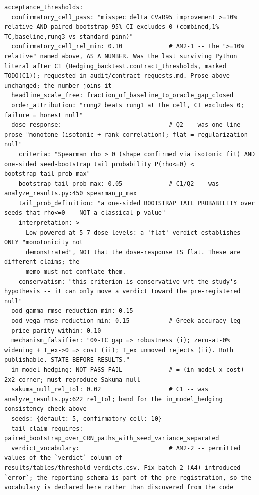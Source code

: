 \documentclass{article}
\begin{document}
\begin{lstlisting}[basicstyle=\ttfamily\tiny,breaklines=true,breakatwhitespace=true,keepspaces=true,columns=fullflexible,postbreak=\mbox{$\hookrightarrow$\space},breakindent=1.5em]
acceptance_thresholds:
  confirmatory_cell_pass: "misspec delta CVaR95 improvement >=10% relative AND paired-bootstrap 95% CI excludes 0 (combined,1% TC,baseline,rung3 vs standard_pinn)"
  confirmatory_cell_rel_min: 0.10             # AM2-1 -- the ">=10% relative" named above, AS A NUMBER. Was the last surviving Python literal after C1 (Hedging_backtest.contract_thresholds, marked TODO(C1)); requested in audit/contract_requests.md. Prose above unchanged; the number joins it
  headline_scale_free: fraction_of_baseline_to_oracle_gap_closed
  order_attribution: "rung2 beats rung1 at the cell, CI excludes 0; failure = honest null"
  dose_response:                              # Q2 -- was one-line prose "monotone (isotonic + rank correlation); flat = regularization null"
    criteria: "Spearman rho > 0 (shape confirmed via isotonic fit) AND one-sided seed-bootstrap tail probability P(rho<=0) < bootstrap_tail_prob_max"
    bootstrap_tail_prob_max: 0.05             # C1/Q2 -- was analyze_results.py:450 spearman_p_max
    tail_prob_definition: "a one-sided BOOTSTRAP TAIL PROBABILITY over seeds that rho<=0 -- NOT a classical p-value"
    interpretation: >
      Low-powered at 5-7 dose levels: a 'flat' verdict establishes ONLY "monotonicity not
      demonstrated", NOT that the dose-response IS flat. These are different claims; the
      memo must not conflate them.
    conservatism: "this criterion is conservative wrt the study's hypothesis -- it can only move a verdict toward the pre-registered null"
  ood_gamma_rmse_reduction_min: 0.15
  ood_vega_rmse_reduction_min: 0.15           # Greek-accuracy leg
  price_parity_within: 0.10
  mechanism_falsifier: "0%-TC gap => robustness (i); zero-at-0% widening + T_ex->0 => cost (ii); T_ex unmoved rejects (ii). Both publishable. STATE BEFORE RESULTS."
  in_model_hedging: NOT_PASS_FAIL             # = (in-model x cost) 2x2 corner; must reproduce Sakuma null
  sakuma_null_rel_tol: 0.02                   # C1 -- was analyze_results.py:622 rel_tol; band for the in_model_hedging consistency check above
  seeds: {default: 5, confirmatory_cell: 10}
  tail_claim_requires: paired_bootstrap_over_CRN_paths_with_seed_variance_separated
  verdict_vocabulary:                         # AM2-2 -- permitted values of the `verdict` column of results/tables/threshold_verdicts.csv. Fix batch 2 (A4) introduced `error`; the reporting schema is part of the pre-registration, so the vocabulary is declared here rather than discovered from the code

\end{lstlisting}
\end{document}
